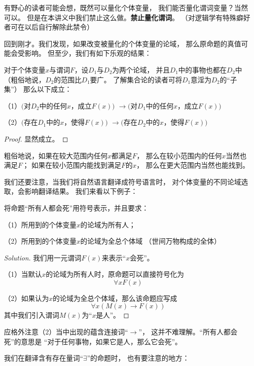 有野心的读者可能会想，既然可以量化个体变量，
我们能否量化谓词变量？当然可以。
但是在本讲义中我们禁止这么做。\textbf{禁止量化谓词}。
（对逻辑学有特殊癖好者可在以后自行解除此禁令）

回到刚才。我们发现，如果改变被量化的个体变量的论域，
那么原命题的真值可能会受影响。
但至少，我们有如下乐观的结果：

\begin{thm}[论域的收缩与扩张]
对于个体变量$x$与谓词$F$，设$D_1$与$D_2$为两个论域，
并且$D_1$中的事物也都在$D_2$中
（粗俗地说，$D_2$的范围比$D_1$要广。
了解集合论的读者可将$D_1$意淫为$D_2$的“子集”）
那么以下成立：

（1）$($对$D_2$中的任何$x$，成立$F(x))$
$\rightarrow($对$D_1$中的任何$x$，成立$F(x))$

（2）$($存在$D_1$中的$x$，使得$F(x))$
$\rightarrow($存在$D_2$中的$x$，使得$F(x))$
\end{thm}

\begin{proof}
显然成立。
\end{proof}

粗俗地说，如果在较大范围内任何$x$都满足$F$，
那么在较小范围内的任何$x$当然也满足$F$；
如果在较小范围内能找到满足$F$的$x$，
那么在更大范围内当然也能找到。\vs

我们还要注意，当我们将自然语言翻译成符号语言时，
对个体变量的不同论域选取，会影响翻译结果。
我们来看以下例子：

\begin{example}
将命题“所有人都会死”用符号表示，并且要求：

（1）所用到的个体变量$x$的论域为所有人；

（2）所用到的个体变量$x$的论域为全总个体域
（世间万物构成的全体）
\end{example}

\begin{proof}[Solution]
我们用一元谓词$F(x)$来表示“$x$会死”。

（1）当默认$x$的论域为所有人时，原命题可以直接符号化为
$$\forall xF(x)$$

（2）如果认为$x$的论域为全总个体域，那么该命题应写成
$$\forall x(M(x)\rightarrow F(x))$$
其中我们引入谓词$M(x)$为“$x$是人”。
\end{proof}

应格外注意（2）当中出现的蕴含连接词“$\rightarrow$”，
这并不难理解。“所有人都会死”的意思是
“对于任何事物，如果它是人，那么它会死”。

我们在翻译含有存在量词“$\exists$”的命题时，
也有要注意的地方：


